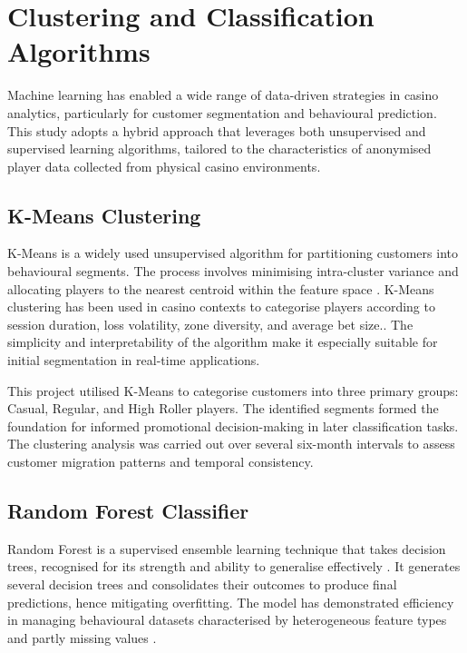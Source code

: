 \documentclass[12pt,a4paper]{report}
\begin{document}
\section{Clustering and Classification Algorithms}

Machine learning has enabled a wide range of data-driven strategies in casino analytics, particularly for customer segmentation and behavioural prediction. This study adopts a hybrid approach that leverages both unsupervised and supervised learning algorithms, tailored to the characteristics of anonymised player data collected from physical casino environments.

\subsection{K-Means Clustering}

K-Means is a widely used unsupervised algorithm for partitioning customers into behavioural segments.  The process involves minimising intra-cluster variance and allocating players to the nearest centroid within the feature space \citep{MacQueen1967}. K-Means clustering has been used in casino contexts to categorise players according to session duration, loss volatility, zone diversity, and average bet size.\citep{Desiata2024a}. The simplicity and interpretability of the algorithm make it especially suitable for initial segmentation in real-time applications.

This project utilised K-Means to categorise customers into three primary groups: Casual, Regular, and High Roller players.  The identified segments formed the foundation for informed promotional decision-making in later classification tasks.  The clustering analysis was carried out over several six-month intervals to assess customer migration patterns and temporal consistency.

\subsection{Random Forest Classifier}

Random Forest is a supervised ensemble learning technique that takes decision trees, recognised for its strength and ability to generalise effectively \citep{Breiman2001}. It generates several decision trees and consolidates their outcomes to produce final predictions, hence mitigating overfitting.  The model has demonstrated efficiency in managing behavioural datasets characterised by heterogeneous feature types and partly missing values \citep{Auer2023}.
\end{document}
